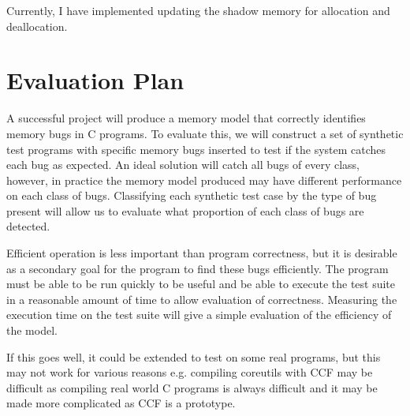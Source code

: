 \documentclass[12pt,twoside]{report}
\begin{document}
Currently, I have implemented updating the shadow memory for allocation and deallocation.

\chapter{Evaluation Plan}

A successful project will produce a memory model that correctly identifies memory bugs in C programs. To evaluate this, we will construct a set of synthetic test programs with specific memory bugs inserted to test if the system catches each bug as expected. An ideal solution will catch all bugs of every class, however, in practice the memory model produced may have different performance on each class of bugs. Classifying each synthetic test case by the type of bug present will allow us to evaluate what proportion of each class of bugs are detected.

Efficient operation is less important than program correctness, but it is desirable as a secondary goal for the program to find these bugs efficiently. The program must be able to be run quickly to be useful and be able to execute the test suite in a reasonable amount of time to allow evaluation of correctness. Measuring the execution time on the test suite will give a simple evaluation of the efficiency of the model.

If this goes well, it could be extended to test on some real programs, but this may not work for various reasons e.g. compiling coreutils with CCF may be difficult as compiling real world C programs is always difficult and it may be made more complicated as CCF is a prototype.
\end{document}
